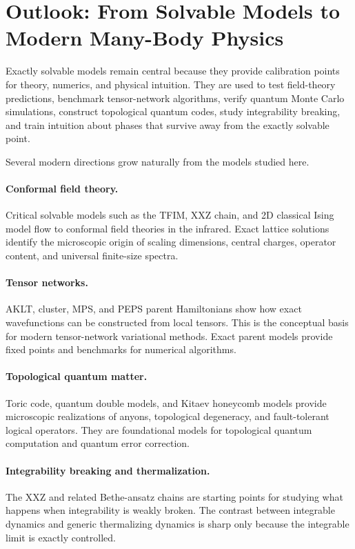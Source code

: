 \section{Outlook: From Solvable Models to Modern Many-Body Physics}
\label{sec:outlook-solvable-models-modern-physics}

Exactly solvable models remain central because they provide calibration points for theory, numerics, and physical intuition.  They are used to test field-theory predictions, benchmark tensor-network algorithms, verify quantum Monte Carlo simulations, construct topological quantum codes, study integrability breaking, and train intuition about phases that survive away from the exactly solvable point.

Several modern directions grow naturally from the models studied here.

\paragraph{Conformal field theory.}
Critical solvable models such as the TFIM, XXZ chain, and 2D classical Ising model flow to conformal field theories in the infrared.  Exact lattice solutions identify the microscopic origin of scaling dimensions, central charges, operator content, and universal finite-size spectra.

\paragraph{Tensor networks.}
AKLT, cluster, MPS, and PEPS parent Hamiltonians show how exact wavefunctions can be constructed from local tensors.  This is the conceptual basis for modern tensor-network variational methods.  Exact parent models provide fixed points and benchmarks for numerical algorithms.

\paragraph{Topological quantum matter.}
Toric code, quantum double models, and Kitaev honeycomb models provide microscopic realizations of anyons, topological degeneracy, and fault-tolerant logical operators.  They are foundational models for topological quantum computation and quantum error correction.

\paragraph{Integrability breaking and thermalization.}
The XXZ and related Bethe-ansatz chains are starting points for studying what happens when integrability is weakly broken.  The contrast between integrable dynamics and generic thermalizing dynamics is sharp only because the integrable limit is exactly controlled.

